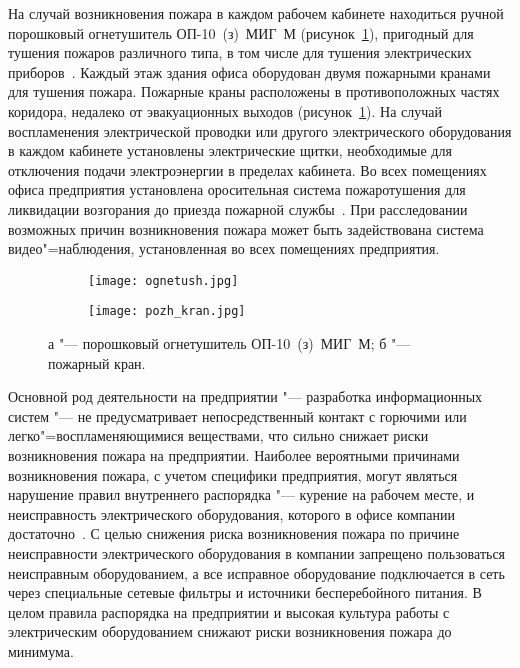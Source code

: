 На случай возникновения пожара в каждом рабочем кабинете находиться ручной порошковый огнетушитель \mbox{ОП-10}~(з)~МИГ~М (рисунок~\ref{fig:extinguishing_fire}), пригодный для тушения пожаров различного типа, в том числе для тушения электрических приборов~\cite[\ignore{раздел 5.5.7,} с.~221\,--\,323]{michnuk_2009}.
Каждый этаж здания офиса оборудован двумя пожарными кранами для тушения пожара.
Пожарные краны расположены в противоположных частях коридора, недалеко от эвакуационных выходов (рисунок~\ref{fig:extinguishing_fire}).
На случай воспламенения электрической проводки или другого электрического оборудования в каждом кабинете установлены электрические щитки, необходимые для отключения подачи электроэнергии в пределах кабинета.
Во всех помещениях офиса предприятия установлена оросительная система пожаротушения для ликвидации возгорания до приезда пожарной службы~\cite[\ignore{раздел~5.5.6,} с.~318\,--\,320]{michnuk_2009}.
При расследовании возможных причин возникновения пожара может быть задействована система видео"=наблюдения, установленная во всех помещениях предприятия.

\begin{figure}[ht]
\centering
  \begin{subfigure}[b]{0.45\textwidth} 
    \centering
    \texttt{[image: ognetush.jpg]}  
    \caption{}
  \end{subfigure}
  \begin{subfigure}[b]{0.45\textwidth} 
    \centering
    \texttt{[image: pozh\_kran.jpg]}  
    \caption{}
  \end{subfigure}
  \caption{ а "--- порошковый огнетушитель \mbox{ОП-10}~(з)~МИГ~М;
            б "--- пожарный кран.}
  \label{fig:extinguishing_fire}
\end{figure}

Основной род деятельности на предприятии "--- разработка информационных систем "--- не предусматривает непосредственный контакт с горючими или легко"=воспламеняющимися веществами, что сильно снижает риски возникновения пожара на предприятии.
Наиболее вероятными причинами возникновения пожара, с учетом специфики предприятия, могут являться нарушение правил внутреннего распорядка "--- курение на рабочем месте, и неисправность электрического оборудования, которого в офисе компании достаточно~\cite[\ignore{раздел 5.5.1,} с.~312]{michnuk_2009}.
С целью снижения риска возникновения пожара по причине неисправности электрического оборудования в компании запрещено пользоваться неисправным оборудованием, а все исправное оборудование подключается в сеть через специальные сетевые фильтры и источники бесперебойного питания.
В целом правила распорядка на предприятии и высокая культура работы с электрическим оборудованием снижают риски возникновения пожара до минимума.

